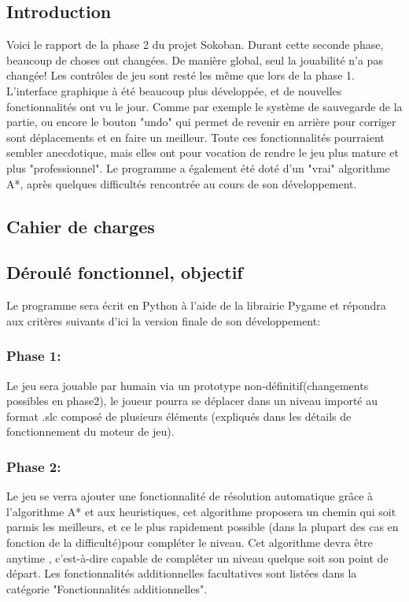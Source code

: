 \documentclass{article}
\begin{document}
\newpage
\begin{center}
	\section{Introduction}
\end{center}
\vspace{1cm}
Voici le rapport de la phase 2 du projet Sokoban. Durant cette seconde phase, beaucoup de choses ont changées. De manière global, seul la jouabilité n'a pas changée! Les contrôles de jeu sont resté les même que lors de la phase 1. L'interface graphique à été beaucoup plus développée, et de nouvelles fonctionnalités ont vu le jour. Comme par exemple le système de sauvegarde de la partie, ou encore le bouton "undo" qui permet de revenir en arrière pour corriger sont déplacements et en faire un meilleur. Toute ces fonctionnalités pourraient sembler anecdotique, mais elles ont pour vocation de rendre le jeu plus mature et plus "professionnel". Le programme a également été doté d'un "vrai" algorithme A*, après quelques difficultés rencontrée au cours de son développement. 
	\newpage
	\begin{center}
	\section{Cahier de charges}
	\end{center}
	\vspace{1cm}
		\subsection{Déroulé fonctionnel, objectif}
		Le programme sera écrit en Python à l’aide de la librairie Pygame et répondra aux critères suivants d’ici la version finale de son développement:
			\subsubsection{Phase 1:}
			Le jeu sera jouable par humain via un prototype non-définitif(changements possibles en phase2), le joueur pourra se déplacer dans un niveau importé au format .slc composé de plusieurs éléments (expliqués dans les détails de fonctionnement du moteur de jeu).
			\subsubsection{Phase 2:}
			Le jeu se verra ajouter une fonctionnalité de résolution automatique grâce à l’algorithme A* et aux heuristiques, cet algorithme proposera un chemin qui soit parmis les meilleurs, et ce le plus rapidement possible (dans la plupart des cas en fonction de la difficulté)pour compléter le niveau. Cet algorithme devra être anytime , c'est-à-dire capable de compléter un niveau quelque soit son point de départ.
Les fonctionnalités additionnelles facultatives sont listées dans la catégorie
"Fonctionnalités additionnelles".
\end{document}
